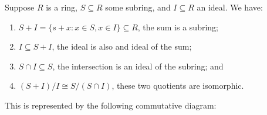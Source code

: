 \begin{theorem}\label{thm:iso-2-ring}
    Suppose \(R\) is a ring, \(S \subseteq R\) some subring,
    and \(I \subseteq R\) an ideal.
    We have:
    \begin{enumerate}[label={(\alph*)}, itemsep=0mm]
        \item \(S + I = \{s+x : x \in S, x \in I\} \subseteq R\),
            the sum is a subring;
        \item \(I \subseteq S + I\), the ideal is also and ideal of the sum;
        \item \(S \cap I \subseteq S\),
            the intersection is an ideal of the subring; and
        \item \((S+I)/I \cong S/(S \cap I)\),
            these two quotients are isomorphic.
    \end{enumerate}

    This is represented by the following commutative diagram:
    \begin{center}
    \end{center}
\end{theorem}
